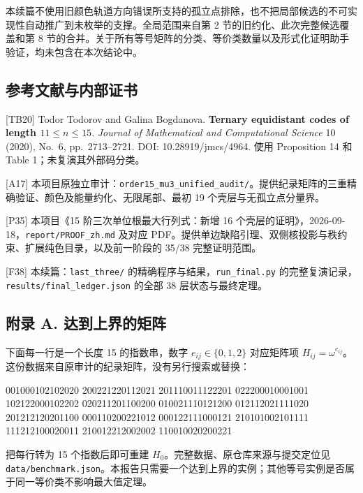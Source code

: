 \documentclass[
  11pt,
  a4paper,
]{article}
\newenvironment{Shaded}{}{}
\newcommand{\NormalTok}[1]{#1}
\begin{document}
本续篇不使用旧颜色轨道方向错误所支持的孤立点排除，也不把局部候选的不可实现性自动推广到未枚举的支撑。全局范围来自第
2 节的旧约化、此次完整候选覆盖和第 8
节的合并。关于所有等号矩阵的分类、等价类数量以及形式化证明助手验证，均未包含在本次结论中。

\subsection{参考文献与内部证书}\label{ux53c2ux8003ux6587ux732eux4e0eux5185ux90e8ux8bc1ux4e66}

{[}TB20{]} Todor Todorov and Galina Bogdanova. \textbf{Ternary
equidistant codes of length \(11\le n\le15\)}. \emph{Journal of
Mathematical and Computational Science} 10 (2020), No.~6,
pp.~2713--2721. DOI: 10.28919/jmcs/4964. 使用 Proposition 14 和 Table
1；未复演其外部码分类。

{[}A17{]}
本项目原独立审计：\texttt{order15\_mu3\_unified\_audit/}。提供纪录矩阵的三重精确验证、颜色及能量约化、无限尾部、最初
19 个壳层与无孤立点分量界。

{[}P35{]} 本项目《15 阶三次单位根最大行列式：新增 16
个壳层的证明》，2026-09-18，\texttt{report/PROOF\_zh.md} 及对应
PDF。提供单边缺陷引理、双侧核投影与秩约束、扩展纯色目录，以及前一阶段的
35/38 完整证明范围。

{[}F38{]} 本续篇：\texttt{last\_three/}
的精确程序与结果，\texttt{run\_final.py}
的完整复演记录，\texttt{results/final\_ledger.json} 的全部 38
层状态与最终定理。

\subsection{附录 A.
达到上界的矩阵}\label{ux9644ux5f55-a.-ux8fbeux5230ux4e0aux754cux7684ux77e9ux9635}

下面每一行是一个长度 15 的指数串，数字 \(e_{ij}\in\{0,1,2\}\) 对应矩阵项
\(H_{ij}=\omega^{e_{ij}}\)。这份数据来自原审计的纪录矩阵，没有另行搜索或替换：

\begin{Shaded}
\begin{Highlighting}[]
\NormalTok{001000102102020}
\NormalTok{200221220112021}
\NormalTok{201110011122201}
\NormalTok{022200010001001}
\NormalTok{102122000102202}
\NormalTok{020211201100200}
\NormalTok{010021110121200}
\NormalTok{012112021111020}
\NormalTok{201212120201100}
\NormalTok{000110200221012}
\NormalTok{000122111000121}
\NormalTok{210101002101111}
\NormalTok{111212100020011}
\NormalTok{210012212002002}
\NormalTok{110010020200221}
\end{Highlighting}
\end{Shaded}

把每行转为 15 个指数后即可重建 \(H_0\)。完整数据、原仓库来源与提交定位见
\texttt{data/benchmark.json}。本报告只需要一个达到上界的实例；其他等号实例是否属于同一等价类不影响最大值定理。
\end{document}
